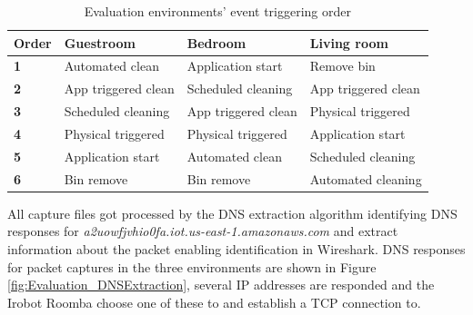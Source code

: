 \begin{table}[H]
\small
\centering
\caption{Evaluation environments' event triggering order}
\label{tab:evaleventoverview}
\begin{tabular}{|l|l|l|l|}
\hline
\textbf{Order} & \textbf{Guestroom}          & \textbf{Bedroom}          & \textbf{Living room}          \\ \hline
\textbf{1}        & Automated clean                & Application start              & Remove bin                     \\ \hline
\textbf{2}        & App triggered clean            & Scheduled cleaning             & App triggered clean            \\ \hline
\textbf{3}        & Scheduled cleaning             & App triggered clean            & Physical triggered            \\ \hline
\textbf{4}        & Physical triggered            & Physical triggered            & Application start              \\ \hline
\textbf{5}        & Application start              & Automated clean                & Scheduled cleaning             \\ \hline
\textbf{6}        & Bin remove                     & Bin remove                     & Automated cleaning             \\ \hline
\end{tabular}
\end{table}

All capture files got processed by the \gls{DNS} extraction algorithm identifying \gls{DNS} responses for \textit{a2uowfjvhio0fa.iot.us-east-1.amazonaws.com} and extract information about the packet enabling identification in Wireshark. \gls{DNS} responses for packet captures in the three environments are shown in Figure \ref{fig:Evaluation_DNSExtraction}, several \gls{IP} addresses are responded and the Irobot Roomba choose one of these to and establish a \gls{TCP} connection to. 

